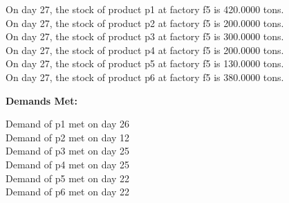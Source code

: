 \begin{table}[H]
\begin{multicols}{2}
\begin{tabbing}
On day 27, the stock of product p1 at factory f5 is 420.0000 tons. \\
On day 27, the stock of product p2 at factory f5 is 200.0000 tons. \\
On day 27, the stock of product p3 at factory f5 is 300.0000 tons. \\
On day 27, the stock of product p4 at factory f5 is 200.0000 tons. \\
On day 27, the stock of product p5 at factory f5 is 130.0000 tons. \\
On day 27, the stock of product p6 at factory f5 is 380.0000 tons. \\
\end{tabbing} \vspace{-2.0em}
\textbf{Demands Met:}\\
\vspace{-2.6em}
\begin{tabbing}
Demand of p1 met on day 26 \\
Demand of p2 met on day 12 \\
Demand of p3 met on day 25 \\
Demand of p4 met on day 25 \\
Demand of p5 met on day 22 \\ 
Demand of p6 met on day 22 \\
   \end{tabbing}
    \end{multicols} \\
    \bottomrule
\end{table}